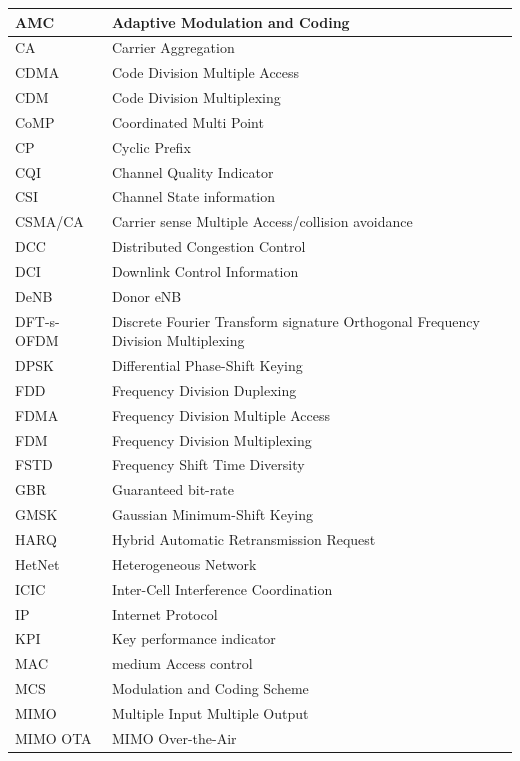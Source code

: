 \documentclass[12pt]{report} %
\begin{document}
{\begin{longtable}{|P{3.0cm}|P{10.0cm}|}
		AMC & Adaptive Modulation and Coding \\
		\hline
		CA & Carrier Aggregation \\
		\hline
		CDMA & Code Division Multiple Access \\
		\hline
		CDM & Code Division Multiplexing \\
		\hline
		CoMP & Coordinated Multi Point \\
		\hline
		CP & Cyclic Prefix \\
		\hline
		CQI & Channel Quality Indicator \\
		\hline
		CSI & Channel State information \\
		\hline
		CSMA/CA & Carrier sense Multiple Access/collision avoidance \\
		\hline
		DCC & Distributed Congestion Control \\
		\hline
		DCI & Downlink Control Information \\
		\hline
		DeNB & Donor eNB \\
		\hline
		DFT-s-OFDM & Discrete Fourier Transform signature Orthogonal Frequency Division Multiplexing \\
		\hline
		DPSK & Differential Phase-Shift Keying \\
		\hline
		FDD & Frequency Division Duplexing \\
		\hline
		FDMA & Frequency Division Multiple Access \\
		\hline
		FDM & Frequency Division Multiplexing \\
		\hline
		FSTD & Frequency Shift Time Diversity \\
		\hline
		GBR & Guaranteed bit-rate \\
		\hline
		GMSK & Gaussian Minimum-Shift Keying \\
		\hline
		HARQ & Hybrid Automatic Retransmission Request \\
		\hline
		HetNet & Heterogeneous Network \\
		\hline
		ICIC & Inter-Cell Interference Coordination \\
		\hline
		IP & Internet Protocol \\
		\hline
		KPI & Key performance indicator \\
		\hline
		MAC & medium Access control \\
		\hline
		MCS & Modulation and Coding Scheme \\
		\hline
		MIMO & Multiple Input Multiple Output \\
		\hline
		MIMO OTA & MIMO Over-the-Air \\

\end{longtable}}
\end{document}
